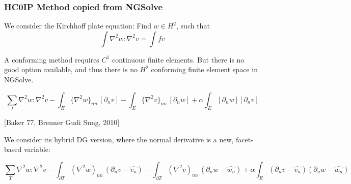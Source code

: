 \subsubsection{HC0IP Method copied from NGSolve}%
\label{ssub:hc0ip_method_from_ngsolve}


We consider the Kirchhoff plate equation: Find $w \in H^2$, such that
$$
\int \nabla^2 w : \nabla^2 v = \int f v
$$

A conforming method requires $C^1$ continuous finite elements. But there is no good option available, and thus there is no $H^2$ conforming finite element space in NGSolve.

$$
\sum_T \nabla^2 w : \nabla^2 v
- \int_{E} \{\nabla^2 w\}_{nn} \, [\partial_n v]
- \int_{E} \{\nabla^2 v\}_{nn} \, [\partial_n w] + \alpha \int_E  [\partial_n w]  [\partial_n v]
$$

[Baker 77, Brenner Gudi Sung, 2010]

We consider its hybrid DG version, where the normal derivative is a new, facet-based variable:

$$
\sum_T \nabla^2 w : \nabla^2 v
- \int_{\partial T} (\nabla^2 w)_{nn} \, (\partial_n v - \widehat{v_n})
- \int_{\partial T} (\nabla^2 v)_{nn} \, (\partial_n w - \widehat{w_n}) + \alpha \int_E (\partial_n v - \widehat{v_n}) (\partial_n w - \widehat{w_n})
$$











